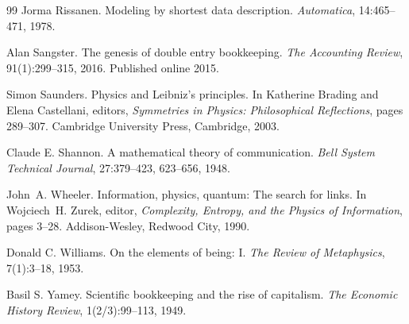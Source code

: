 \documentclass[11pt,a4paper]{article}
\begin{document}
\begin{thebibliography}{99}
Jorma Rissanen.
\newblock Modeling by shortest data description.
\newblock \emph{Automatica}, 14:465--471, 1978.

Alan Sangster.
\newblock The genesis of double entry bookkeeping.
\newblock \emph{The Accounting Review}, 91(1):299--315, 2016.
\newblock Published online 2015.

Simon Saunders.
\newblock Physics and Leibniz's principles.
\newblock In Katherine Brading and Elena Castellani, editors, \emph{Symmetries in Physics:
Philosophical Reflections}, pages 289--307. Cambridge University Press, Cambridge, 2003.

Claude E. Shannon.
\newblock A mathematical theory of communication.
\newblock \emph{Bell System Technical Journal}, 27:379--423, 623--656, 1948.

John~A. Wheeler.
\newblock Information, physics, quantum: The search for links.
\newblock In Wojciech~H. Zurek, editor, \emph{Complexity, Entropy, and the Physics of Information},
pages 3--28. Addison-Wesley, Redwood City, 1990.

Donald C. Williams.
\newblock On the elements of being: I.
\newblock \emph{The Review of Metaphysics}, 7(1):3--18, 1953.

Basil S. Yamey.
\newblock Scientific bookkeeping and the rise of capitalism.
\newblock \emph{The Economic History Review}, 1(2/3):99--113, 1949.

\end{thebibliography}
\end{document}
